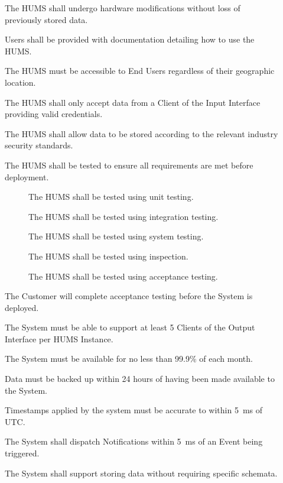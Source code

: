 \begin{description}
	\item[] The HUMS shall undergo hardware modifications without loss 
	of previously stored data.
	\item[] Users shall be provided with documentation detailing 
	how to use the HUMS.
	\item[] The HUMS must be accessible to End Users regardless of
	their geographic location.
	\item[]  The HUMS shall only accept data from a Client of the Input
	Interface providing valid credentials.
	\item[] The HUMS shall allow data to be stored according to the relevant
	industry security standards.
	\item[]  The HUMS shall be tested to ensure all requirements are 
	met before deployment.
	\begin{description}
	\item[]  The HUMS shall be tested using unit testing.
	\item[]  The HUMS shall be tested using integration testing.
	\item[]  The HUMS shall be tested using system testing.
	\item[]  The HUMS shall be tested using inspection.
	\item[]  The HUMS shall be tested using acceptance testing.
	\end{description}
	\item[] The Customer will complete acceptance testing before the System is deployed.
	\item[] The System must be able to support at least 5 Clients of the Output Interface per HUMS Instance. 
	\item[] The System must be available for no less than 99.9\% of 
	each month.
	\item[] Data must be backed up within 24 hours of having been 
	made available to the System.
	 \item[] Timestamps applied by the system must be accurate to 
	within 5~ms of UTC.
	\item[]  The System shall dispatch Notifications within 5~ms of an 
	Event being triggered.
	\item[] The System shall support storing data without requiring 
	specific schemata.
\end{description}

